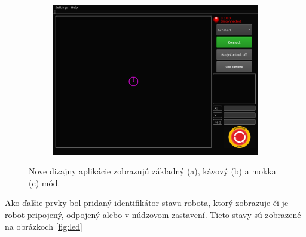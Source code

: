 \begin{figure}[!htbp]
	\begin{subfigure}{0.49\textwidth}
		\includegraphics[width=\textwidth]{img/mocha-app.png}
	\end{subfigure}
	\caption{ Nove dizajny aplikácie zobrazujú základný (a), kávový (b) a mokka (c) mód.}
	\label{fig:newUI}
\end{figure}

Ako ďalšie prvky bol pridaný identifikátor stavu robota, ktorý zobrazuje či je robot pripojený, odpojený alebo v
núdzovom zastavení. Tieto stavy sú zobrazené na obrázkoch \ref{fig:led}

